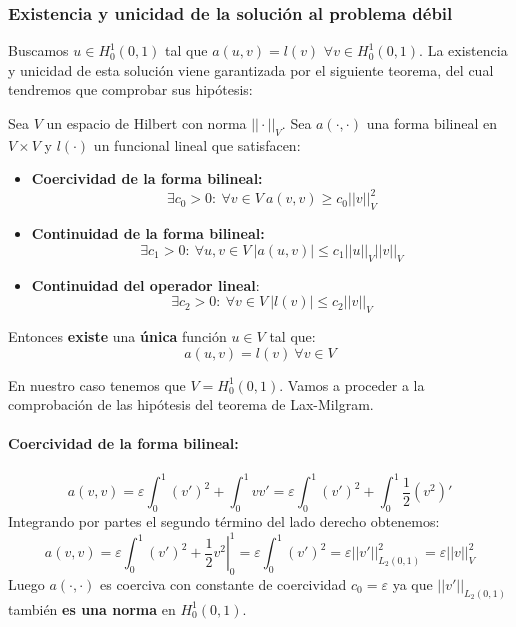 \documentclass[spanish]{mathnotes}
\begin{document}
	
	\newpage
	\subsubsection{Existencia y unicidad de la solución al problema débil}
	Buscamos $u\in H_0^1(0,1)$ tal que $a(u,v) = l(v)$ $\forall v\in H_0^1(0,1)$.
	La existencia y unicidad de esta solución viene garantizada por el siguiente teorema, del cual tendremos que comprobar sus hipótesis:
	\begin{thm}
		Sea $V$ un espacio de Hilbert con norma $||\cdot||_V$. Sea $a(\cdot, \cdot)$ una forma bilineal en $V\times V$ y $l(\cdot)$ un funcional lineal que satisfacen:
		\begin{itemize}
			\item \textbf{Coercividad de la forma bilineal:}
			$$\exists c_0 > 0:\ \forall v \in V\ a(v,v) \ge c_0||v||_V^2$$
			\item \textbf{Continuidad de la forma bilineal:}
			$$\exists c_1 > 0:\ \forall u,v\in V\ |a(u,v)| \le c_1 ||u||_V||v||_V$$
			\item \textbf{Continuidad del operador lineal}:
			$$\exists c_2 > 0:\ \forall v\in V\ |l(v)|\le c_2||v||_V$$
		\end{itemize}
		Entonces \textbf{existe} una \textbf{única} función $u\in V$ tal que:
		$$a(u,v) = l(v)\ \forall v\in V$$
	\end{thm}
	En nuestro caso tenemos que $V=H_0^1(0,1)$.
	Vamos a proceder a la comprobación de las hipótesis del teorema de Lax-Milgram.
	\paragraph{Coercividad de la forma bilineal:} 
	\begin{equation*}
		a(v,v) = \varepsilon\int_0^1(v')^2 + \int_0^1vv' = \varepsilon\int_0^1 (v')^2 + \int_0^1 \frac{1}{2} (v^2)'
	\end{equation*}
	Integrando por partes el segundo término del lado derecho obtenemos: 
	\begin{equation*}
		a(v,v) = \varepsilon\int_0^1(v')^2 + \left.\frac{1}{2}v^2\right|_0^1 = \varepsilon\int_0^1(v')^2
		=\varepsilon||v'||_{L_2(0,1)}^2 = \varepsilon||v||_{V}^2
	\end{equation*}
	Luego $a(\cdot, \cdot)$ es coerciva con constante de coercividad $c_0=\varepsilon$ ya que $||v'||_{L_2(0,1)}$ también \textbf{es una norma} en $H_0^1(0,1)$.
\end{document}
